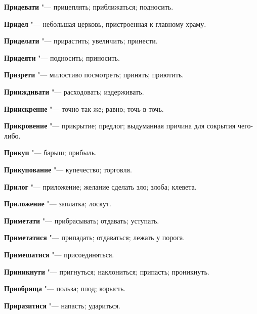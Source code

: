 \begin{mymulticols}{2}
\noindent\textbf{Придевати} "--- прицеплять; приближаться; подносить. 




\noindent\textbf{Придел} "--- небольшая церковь, пристроенная к главному храму. 




\noindent\textbf{Приделати} "--- прирастить; увеличить; принести. 




\noindent\textbf{Придеяти} "--- подносить; приносить. 




\noindent\textbf{Призрети} "--- милостиво посмотреть; принять; приютить. 




\noindent\textbf{Прииждивати} "--- расходовать; издерживать. 




\noindent\textbf{Приискренне} "--- точно так же; равно; точь-в-точь. 




\noindent\textbf{Прикровение} "--- прикрытие; предлог; выдуманная причина для сокрытия чего-либо. 




\noindent\textbf{Прикуп} "--- барыш; прибыль. 




\noindent\textbf{Прикупование} "--- купечество; торговля. 




\noindent\textbf{Прилог} "--- приложение; желание сделать зло; злоба; клевета. 




\noindent\textbf{Приложение} "--- заплатка; лоскут. 




\noindent\textbf{Приметати} "--- прибрасывать; отдавать; уступать. 




\noindent\textbf{Приметатися} "--- припадать; отдаваться; лежать у порога. 




\noindent\textbf{Примешатися} "--- присоединяться. 




\noindent\textbf{Приникнути} "--- пригнуться; наклониться; припасть; проникнуть. 




\noindent\textbf{Приобряща} "--- польза; плод; корысть. 




\noindent\textbf{Приразитися} "--- напасть; удариться. 





\end{mymulticols}
